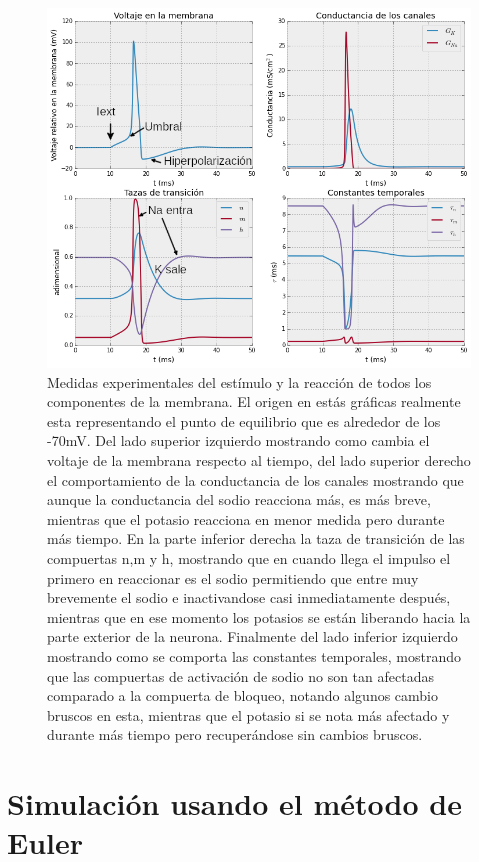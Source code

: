 \begin{figure}[H]
 \includegraphics[scale=0.6]{../Figuras/disparo.png}
 \caption{Medidas experimentales del estímulo y la reacción de todos los componentes de la membrana. El origen en estás gráficas realmente esta representando el punto de equilibrio que es alrededor de los -70mV. Del lado superior izquierdo mostrando como cambia el voltaje de la membrana respecto al tiempo, del lado superior derecho el comportamiento de la conductancia de los canales mostrando que aunque la conductancia del sodio reacciona más, es más breve, mientras que el potasio reacciona en menor medida pero durante más tiempo. En la parte inferior derecha la taza de transición de las compuertas n,m y h, mostrando que en cuando llega el impulso el primero en reaccionar es el sodio permitiendo que entre muy brevemente el sodio e inactivandose casi inmediatamente después, mientras que en ese momento los potasios se están liberando hacia la parte exterior de la neurona. Finalmente del lado inferior izquierdo mostrando como se comporta las constantes temporales, mostrando que las compuertas de activación de sodio no son tan afectadas comparado a la compuerta de bloqueo, notando algunos cambio bruscos en esta, mientras que el potasio si se nota más afectado y durante más tiempo pero recuperándose sin cambios bruscos. }
 \label{fig:voltajeActInac1}
\end{figure}




\section{Simulación usando el método de Euler}


